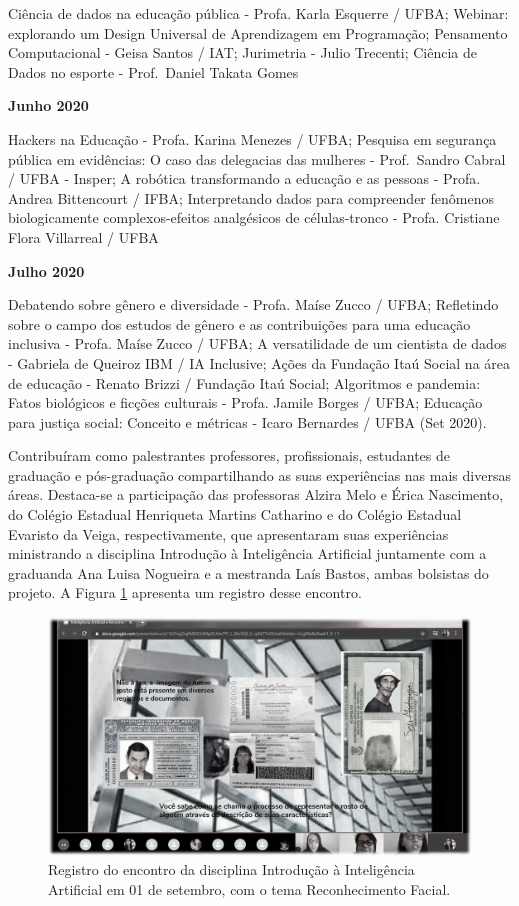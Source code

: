 \documentclass[
]{book}
\begin{document}
Ciência de dados na educação pública - Profa. Karla Esquerre / UFBA; Webinar: explorando um Design Universal de Aprendizagem em Programação; Pensamento Computacional - Geisa Santos / IAT; Jurimetria - Julio Trecenti; Ciência de Dados no esporte - Prof.~Daniel Takata Gomes

\textbf{Junho 2020}

Hackers na Educação - Profa. Karina Menezes / UFBA; Pesquisa em segurança pública em evidências: O caso das delegacias das mulheres - Prof.~Sandro Cabral / UFBA - Insper; A robótica transformando a educação e as pessoas - Profa. Andrea Bittencourt / IFBA; Interpretando dados para compreender fenômenos biologicamente complexos-efeitos analgésicos de células-tronco - Profa. Cristiane Flora Villarreal / UFBA

\textbf{Julho 2020}

Debatendo sobre gênero e diversidade - Profa. Maíse Zucco / UFBA; Refletindo sobre o campo dos estudos de gênero e as contribuições para uma educação inclusiva - Profa. Maíse Zucco / UFBA; A versatilidade de um cientista de dados - Gabriela de Queiroz IBM / IA Inclusive; Ações da Fundação Itaú Social na área de educação - Renato Brizzi / Fundação Itaú Social; Algoritmos e pandemia: Fatos biológicos e ficções culturais - Profa. Jamile Borges / UFBA; Educação para justiça social: Conceito e métricas - Icaro Bernardes / UFBA (Set 2020).

Contribuíram como palestrantes professores, profissionais, estudantes de graduação e pós-graduação compartilhando as suas experiências nas mais diversas áreas. Destaca-se a participação das professoras Alzira Melo e Érica Nascimento, do Colégio Estadual Henriqueta Martins Catharino e do Colégio Estadual Evaristo da Veiga, respectivamente, que apresentaram suas experiências ministrando a disciplina Introdução à Inteligência Artificial juntamente com a graduanda Ana Luisa Nogueira e a mestranda Laís Bastos, ambas bolsistas do projeto. A Figura \ref{fig:cafe} apresenta um registro desse encontro.

\begin{figure}
\includegraphics[width=17.78in]{images/image121} \caption{Registro do encontro da disciplina Introdução à Inteligência Artificial em 01 de setembro, com o tema Reconhecimento Facial.}\label{fig:cafe}
\end{figure}
\end{document}

